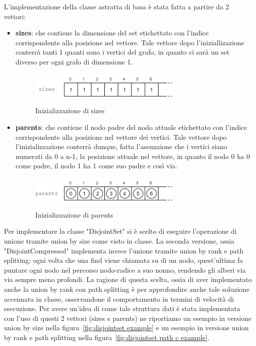 L'implementazione della classe astratta di basa è stata fatta a partire da 2 vettori:
\begin{itemize}
    \item \textbf{sizes}: che contiene la dimensione del set etichettato con l'indice corrispondente alla posizione nel vettore. Tale vettore dopo l'iniziallizazione conterrà tanti 1 quanti sono i vertici del grafo, in quanto ci sarà un set diverso per ogni grafo di dimensione 1. 
    \begin{figure}[h]
    	\caption{Inizializzazione di sizes}
    	\centering
        \includegraphics[width=0.7\textwidth]{./images/DisjointSetSizesVector.png}
    	\label{fig:sizes}
    \end{figure}
    
    \item \textbf{parents}: che contiene il nodo padre del nodo attuale etichettato con l'indice corrispondente alla posizione nel vettore dei vertici. Tale vettore dopo l'inizializzazione conterrà dunque, fatta l'assunzione che i vertici siano numerati da 0 a n-1, la posizione attuale nel vettore, in quanto il nodo 0 ha 0 come padre, il nodo 1 ha 1 come suo padre e così via.
    \begin{figure}[h]
    	\caption{Inizializzazione di parents}
    	\centering
    	\includegraphics[width=0.7\textwidth]{./images/DisjointSetParentsVector.png}
    	\label{fig:parents}
    \end{figure}
\end{itemize}

Per implementare la classe "DisjointSet" si è scelto di eseguire l'operazione di unione tramite union by size come visto in classe. La seconda versione, ossia "DisjointCompressed" implementa invece l'unione tramite union by rank e path splitting: ogni volta che una find viene chiamata su di un nodo, quest'ultima fa puntare ogni nodo nel percorso nodo-radice a suo nonno, rendendo gli alberi via via sempre meno profondi. La ragione di questa scelta, ossia di aver implementato anche la union by rank con path splitting è per approfondire anche tale soluzione accennata in classe, osservandone il comportamento in termini di velocità di esecuzione. Per avere un'idea di come tale struttura dati è stata implementata con l'uso di questi 2 vettori (sizes e parents) ne riportiamo un esempio in versione union by size nella figura~\ref{fig:disjointset example} e un esempio in versione union by rank e path splitting nella figura~\ref{fig:disjointset path c example}.

